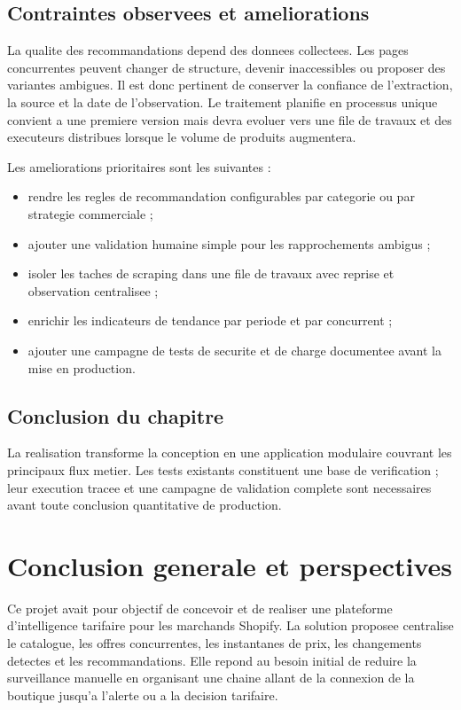 \documentclass[12pt,a4paper,oneside]{report}
\begin{document}
\section{Contraintes observees et ameliorations}
La qualite des recommandations depend des donnees collectees. Les pages concurrentes peuvent changer de structure, devenir inaccessibles ou proposer des variantes ambigues. Il est donc pertinent de conserver la confiance de l'extraction, la source et la date de l'observation. Le traitement planifie en processus unique convient a une premiere version mais devra evoluer vers une file de travaux et des executeurs distribues lorsque le volume de produits augmentera.

Les ameliorations prioritaires sont les suivantes :
\begin{itemize}
  \item rendre les regles de recommandation configurables par categorie ou par strategie commerciale ;
  \item ajouter une validation humaine simple pour les rapprochements ambigus ;
  \item isoler les taches de scraping dans une file de travaux avec reprise et observation centralisee ;
  \item enrichir les indicateurs de tendance par periode et par concurrent ;
  \item ajouter une campagne de tests de securite et de charge documentee avant la mise en production.
\end{itemize}

\section*{Conclusion du chapitre}
La realisation transforme la conception en une application modulaire couvrant les principaux flux metier. Les tests existants constituent une base de verification ; leur execution tracee et une campagne de validation complete sont necessaires avant toute conclusion quantitative de production.
\clearpage

\chapter*{Conclusion generale et perspectives}

Ce projet avait pour objectif de concevoir et de realiser une plateforme d'intelligence tarifaire pour les marchands Shopify. La solution proposee centralise le catalogue, les offres concurrentes, les instantanes de prix, les changements detectes et les recommandations. Elle repond au besoin initial de reduire la surveillance manuelle en organisant une chaine allant de la connexion de la boutique jusqu'a l'alerte ou a la decision tarifaire.
\end{document}
